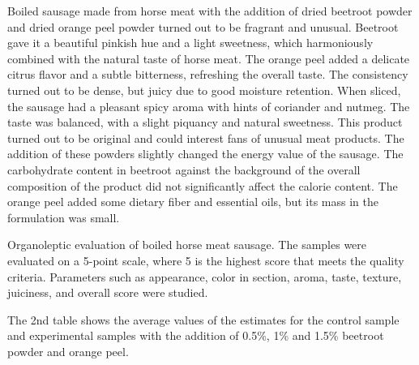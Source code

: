 
\begin{multicols}{2}
Boiled sausage made from horse meat with the addition of dried beetroot
powder and dried orange peel powder turned out to be fragrant and
unusual. Beetroot gave it a beautiful pinkish hue and a light sweetness,
which harmoniously combined with the natural taste of horse meat. The
orange peel added a delicate citrus flavor and a subtle bitterness,
refreshing the overall taste. The consistency turned out to be dense,
but juicy due to good moisture retention. When sliced, the sausage had a
pleasant spicy aroma with hints of coriander and nutmeg. The taste was
balanced, with a slight piquancy and natural sweetness. This product
turned out to be original and could interest fans of unusual meat
products. The addition of these powders slightly changed the energy
value of the sausage. The carbohydrate content in beetroot against the
background of the overall composition of the product did not
significantly affect the calorie content. The orange peel added some
dietary fiber and essential oils, but its mass in the formulation was
small.

Organoleptic evaluation of boiled horse meat sausage. The samples were
evaluated on a 5-point scale, where 5 is the highest score that meets
the quality criteria. Parameters such as appearance, color in section,
aroma, taste, texture, juiciness, and overall score were studied.

The 2nd table shows the average values of the estimates for the control
sample and experimental samples with the addition of 0.5\%, 1\% and
1.5\% beetroot powder and orange peel.
\end{multicols}

